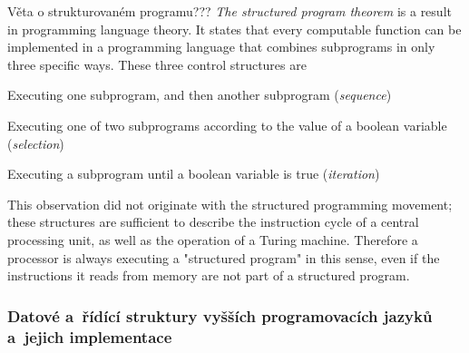 \begin{obecne}{Věta o strukturovaném programu???}
\emph{The structured program theorem} is a result in programming language theory. It states that every computable function can be implemented in a programming language that combines subprograms in only three specific ways. These three control structures are
\begin{pitemize}
    \item Executing one subprogram, and then another subprogram (\emph{sequence})
    \item Executing one of two subprograms according to the value of a boolean variable (\emph{selection})
    \item Executing a subprogram until a boolean variable is true (\emph{iteration})
\end{pitemize}

This observation did not originate with the structured programming movement; these structures are sufficient to describe the instruction cycle of a central processing unit, as well as the operation of a Turing machine. Therefore a processor is always executing a "structured program" in this sense, even if the instructions it reads from memory are not part of a structured program.
\end{obecne}


\subsubsection*{Datové a~řídící struktury vyšších programovacích jazyků a~jejich implementace}

